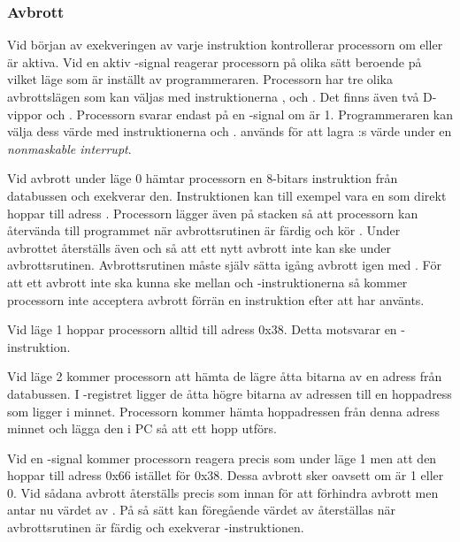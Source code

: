 \documentclass[main.tex]{subfiles}
\begin{document}
\subsubsection{Avbrott}
Vid början av exekveringen av varje instruktion kontrollerar processorn om
 eller  är aktiva. Vid en aktiv -signal reagerar
processorn på olika sätt beroende på vilket läge som är inställt av
programmeraren. Processorn har tre olika avbrottslägen som kan väljas med
instruktionerna ,  och . Det finns även två
D-vippor  och . Processorn svarar endast på en
-signal om  är 1. Programmeraren kan välja dess värde med
instruktionerna  och .  används för att lagra
:s värde under en {\it nonmaskable interrupt}.

Vid avbrott under läge 0 hämtar processorn en 8-bitars instruktion från
databussen och exekverar den. Instruktionen kan till exempel vara en  som direkt hoppar till adress . Processorn lägger även
 på stacken så att processorn kan återvända till programmet när
avbrottsrutinen är färdig och kör . Under avbrottet återställs även
 och  så att ett nytt avbrott inte kan ske under
avbrottsrutinen.  Avbrottsrutinen måste själv sätta igång avbrott igen med
. För att ett avbrott inte ska kunna ske mellan  och
-instruktionerna så kommer processorn inte acceptera avbrott förrän
en instruktion efter att  har använts.

Vid läge 1 hoppar processorn alltid till adress 0x38. Detta motsvarar en
-instruktion.

Vid läge 2 kommer processorn att hämta de lägre åtta bitarna av en adress från
databussen. I -registret ligger de åtta högre bitarna av adressen till
en hoppadress som ligger i minnet. Processorn kommer hämta hoppadressen från
denna adress minnet och lägga den i PC så att ett hopp utförs.

Vid en -signal kommer processorn reagera precis som under läge 1 men
att den hoppar till adress 0x66 istället för 0x38. Dessa avbrott sker oavsett
om  är 1 eller 0. Vid sådana avbrott återställs  precis
som innan för att förhindra avbrott men  antar nu värdet av
. På så sätt kan föregående värdet av  återställas när
avbrottsrutinen är färdig och exekverar -instruktionen.
\end{document}
